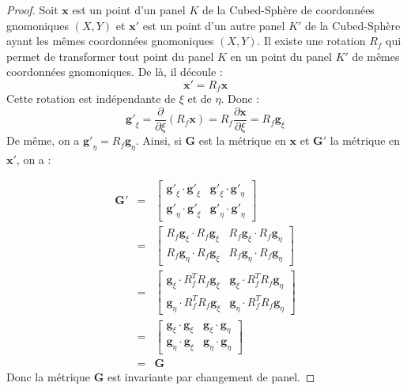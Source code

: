 \begin{proof}
Soit $\mathbf{x}$ est un point d'un panel $K$ de la Cubed-Sphère de coordonnées gnomoniques $(X,Y)$ et $\mathbf{x}'$ est un point d'un autre panel $K'$ de la Cubed-Sphère ayant les mêmes coordonnées gnomoniques $(X,Y)$. Il existe une rotation $R_f$ qui permet de transformer tout point du panel $K$ en un point du panel $K'$ de mêmes coordonnées gnomoniques. De là, il découle :
\begin{equation}
\mathbf{x}' = R_f \mathbf{x}
\end{equation}
Cette rotation est indépendante de $\xi$ et de $\eta$. Donc :
\begin{equation}
\mathbf{g'}_{\xi} = \dfrac{\partial}{\partial \xi} \left( R_f \mathbf{x} \right) = R_f \dfrac{\partial \mathbf{x}}{\partial \xi}  = R_f \mathbf{g}_{\xi}
\end{equation}
De même, on a $\mathbf{g'}_{\eta} = R_f\mathbf{g}_{\eta}$.
Ainsi, si $\mathbf{G}$ est la métrique en $\mathbf{x}$ et $\mathbf{G}'$ la métrique en $\mathbf{x}'$, on a :

\begin{equation*}
\begin{array}{rcl}
\mathbf{G}' &=& \begin{bmatrix}
\mathbf{g'}_{\xi} \cdot \mathbf{g'}_{\xi} & \mathbf{g'}_{\xi} \cdot \mathbf{g'}_{\eta} \\
\mathbf{g'}_{\eta} \cdot \mathbf{g'}_{\xi} & \mathbf{g'}_{\eta} \cdot \mathbf{g'}_{\eta}
\end{bmatrix}\\[10pt]
&=&
\begin{bmatrix}
R_f \mathbf{g}_{\xi} \cdot R_f \mathbf{g}_{\xi} & R_f \mathbf{g}_{\xi} \cdot R_f \mathbf{g}_{\eta} \\
R_f \mathbf{g}_{\eta} \cdot R_f \mathbf{g}_{\xi} & R_f \mathbf{g}_{\eta} \cdot R_f \mathbf{g}_{\eta}
\end{bmatrix}\\[10pt]
&=&
\begin{bmatrix}
\mathbf{g}_{\xi} \cdot R_f^{T} R_f \mathbf{g}_{\xi} & \mathbf{g}_{\xi} \cdot  R_f^{T} R_f \mathbf{g}_{\eta} \\
\mathbf{g}_{\eta} \cdot  R_f^{T} R_f \mathbf{g}_{\xi} & \mathbf{g}_{\eta} \cdot  R_f^{T} R_f \mathbf{g}_{\eta}
\end{bmatrix}\\[10pt]
&=& \begin{bmatrix}
\mathbf{g}_{\xi} \cdot \mathbf{g}_{\xi} & \mathbf{g}_{\xi} \cdot \mathbf{g}_{\eta} \\
\mathbf{g}_{\eta} \cdot \mathbf{g}_{\xi} & \mathbf{g}_{\eta} \cdot \mathbf{g}_{\eta}
\end{bmatrix}\\[10pt]
& = & \mathbf{G}
\end{array}
\end{equation*}
Donc la métrique $\mathbf{G}$ est invariante par changement de panel.
\end{proof}

